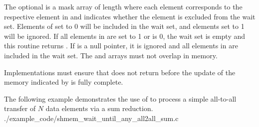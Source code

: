 \begin{apidefinition}
{    The optional  is a mask array of length  where each
    element corresponds to the respective element in  and indicates
    whether the element is excluded from the wait set.  Elements of
     set to 0 will be included in the wait set, and elements set to
    1 will be ignored.  If all elements in  are set to 1 or
     is 0, the wait set is empty and this routine returns
    .  If
     is a null pointer, it is ignored and all elements in
     are included in the wait set.  The  and 
    arrays must not overlap in memory.

    Implementations must ensure that  does not
    return before the update of the memory indicated by  is fully
    complete.
}




\begin{apiexamples}
  \apicexample
      {The following \Cstd[11] example demonstrates the use of
       to process a simple all-to-all transfer
      of $N$ data elements via a sum reduction.}
      {./example_code/shmem_wait_until_any_all2all_sum.c}
      {}

\end{apiexamples}

\end{apidefinition}

